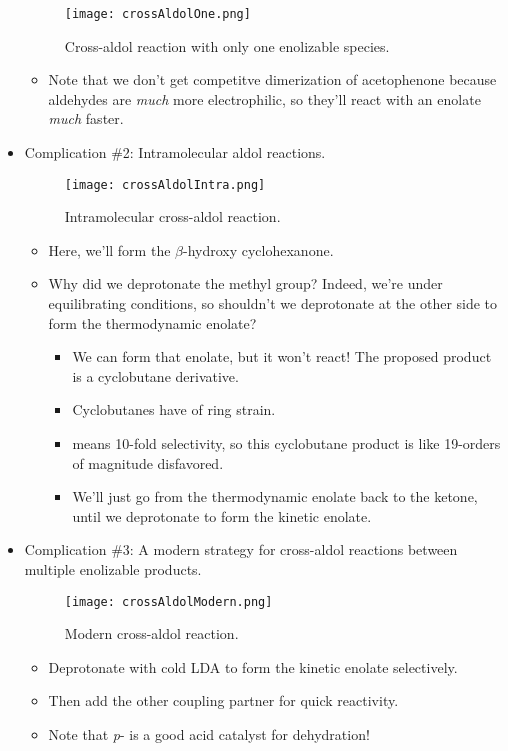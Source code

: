 \documentclass[../notes.tex]{subfiles}
\begin{document}
\begin{itemize}
\begin{figure}[h!]
        \centering
        \texttt{[image: crossAldolOne.png]}
        \caption{Cross-aldol reaction with only one enolizable species.}
        \label{fig:crossAldolOne}
    \end{figure}
    \begin{itemize}
        \item Note that we don't get competitve dimerization of acetophenone because aldehydes are \emph{much} more electrophilic, so they'll react with an enolate \emph{much} faster.
    \end{itemize}
    \pagebreak
    \item Complication \#2: Intramolecular aldol reactions.
    \begin{figure}[h!]
        \centering
        \texttt{[image: crossAldolIntra.png]}
        \caption{Intramolecular cross-aldol reaction.}
        \label{fig:crossAldolIntra}
    \end{figure}
    \begin{itemize}
        \item Here, we'll form the $\beta$-hydroxy cyclohexanone.
        \item Why did we deprotonate the methyl group? Indeed, we're under equilibrating conditions, so shouldn't we deprotonate at the other side to form the thermodynamic enolate?
        \begin{itemize}
            \item We can form that enolate, but it won't react! The proposed product is a cyclobutane derivative.
            \item Cyclobutanes have  of ring strain.
            \item {} means 10-fold selectivity, so this cyclobutane product is like 19-orders of magnitude disfavored.
            \item We'll just go from the thermodynamic enolate back to the ketone, until we deprotonate to form the kinetic enolate.
        \end{itemize}
    \end{itemize}
    \item Complication \#3: A modern strategy for cross-aldol reactions between multiple enolizable products.
    \begin{figure}[h!]
        \centering
        \texttt{[image: crossAldolModern.png]}
        \caption{Modern cross-aldol reaction.}
        \label{fig:crossAldolModern}
    \end{figure}
    \begin{itemize}
        \item Deprotonate with cold LDA to form the kinetic enolate selectively.
        \item Then add the other coupling partner for quick reactivity.
        \item Note that \emph{p}- is a good acid catalyst for dehydration!
    \end{itemize}
\end{itemize}
\end{document}
